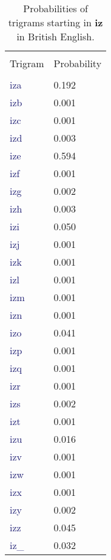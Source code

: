 \documentclass[
12pt,
a4paper,
oneside,
headinclude,
footinclude]{article}
\theoremstyle{definition} %
\begin{document}
\begin{table}[h]
    \centering %
    \begin{tabular}{l l} %
    \hline
    \hline 
    \\[-1.5ex]
    \textcolor{BrickRed}{Trigram} & \textcolor{BrickRed}{Probability}\\ [0.5ex]
    \hline %
    \\[-1.5ex]
    \textcolor{MidnightBlue}{iza} & 0.192 \\
    \textcolor{MidnightBlue}{izb} & 0.001 \\
    \textcolor{MidnightBlue}{izc} & 0.001 \\
    \textcolor{MidnightBlue}{izd} & 0.003 \\
    \textcolor{MidnightBlue}{ize} & 0.594 \\
    \textcolor{MidnightBlue}{izf} & 0.001 \\
    \textcolor{MidnightBlue}{izg} & 0.002 \\
    \textcolor{MidnightBlue}{izh} & 0.003 \\
    \textcolor{MidnightBlue}{izi} & 0.050 \\
    \textcolor{MidnightBlue}{izj} & 0.001 \\
    \textcolor{MidnightBlue}{izk} & 0.001 \\
    \textcolor{MidnightBlue}{izl} & 0.001 \\
    \textcolor{MidnightBlue}{izm} & 0.001 \\
    \textcolor{MidnightBlue}{izn} & 0.001 \\
    \textcolor{MidnightBlue}{izo} & 0.041 \\
    \textcolor{MidnightBlue}{izp} & 0.001 \\
    \textcolor{MidnightBlue}{izq} & 0.001 \\
    \textcolor{MidnightBlue}{izr} & 0.001 \\
    \textcolor{MidnightBlue}{izs} & 0.002 \\
    \textcolor{MidnightBlue}{izt} & 0.001 \\
    \textcolor{MidnightBlue}{izu} & 0.016 \\
    \textcolor{MidnightBlue}{izv} & 0.001 \\
    \textcolor{MidnightBlue}{izw} & 0.001 \\
    \textcolor{MidnightBlue}{izx} & 0.001 \\
    \textcolor{MidnightBlue}{izy} & 0.002 \\
    \textcolor{MidnightBlue}{izz} & 0.045 \\
    \textcolor{MidnightBlue}{iz\_} & 0.032 \\[1ex] %
    \hline %
\end{tabular}
\caption{\label{tab:table-prob-gb}Probabilities of trigrams starting in \textbf{iz} in British English.}
\end{table} 
\end{document}
